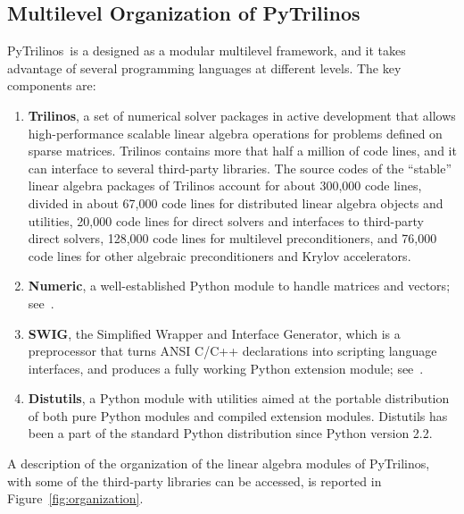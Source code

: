 \documentclass[10pt,relax]{SANDreport}
\newcommand{\PyTrilinos}{{PyTrilinos}}
\begin{document}
\subsection{Multilevel Organization of PyTrilinos}
\label{sec:multilevel}

\PyTrilinos\ is a designed as a modular multilevel framework, and it
takes advantage of several programming languages at different levels.
The key components are:
\begin{enumerate}

\item {\bf Trilinos}, a set of numerical solver packages in active
  development that allows high-performance scalable linear algebra
  operations for problems defined on sparse matrices. Trilinos
  contains more that half a million of code lines, and it can
  interface to several third-party libraries. The source codes of the
  ``stable'' linear algebra packages of Trilinos account for about 300,000
  code lines, divided in about 67,000 code lines for distributed linear
  algebra objects and utilities, 20,000 code lines for direct solvers and
  interfaces to third-party direct solvers, 128,000 code lines for multilevel
  preconditioners, and 76,000 code lines for other algebraic preconditioners
  and Krylov accelerators.

\item {\bf Numeric}, a well-established Python module to handle
  matrices and vectors; see~\cite{numeric}.

\item {\bf SWIG}, the Simplified Wrapper and Interface Generator,
  which is a preprocessor that turns ANSI C/C++ declarations into
  scripting language interfaces, and produces a fully working Python
  extension module; see~\cite{swig}.

\item {\bf Distutils}, a Python module with utilities aimed at the
  portable distribution of both pure Python modules and compiled
  extension modules.  Distutils has been a part of the standard Python
  distribution since Python version 2.2.

\end{enumerate}

A description of the organization of  the linear algebra modules of
PyTrilinos, with some of the third-party libraries can be accessed,
is reported in Figure~\ref{fig:organization}.
\end{document}
